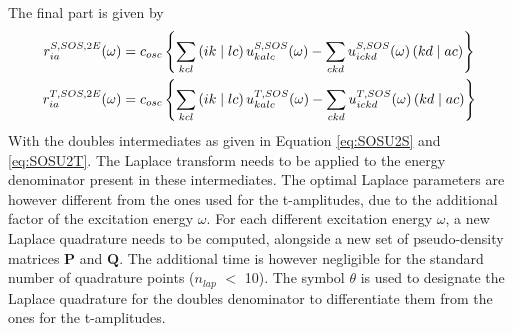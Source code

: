 The final part is given by
\begin{align}
r_{ia}^{S,SOS,2E}(\omega) &= c_{osc} \left\lbrace \sum_{kcl} \left( ik \mid lc \right) u^{S,SOS}_{kalc}(\omega) - \sum_{ckd} u^{S,SOS}_{ickd}(\omega) \left( kd \mid ac \right) \right\rbrace  \label{eq:SIGMA2ES}\\
r_{ia}^{T,SOS,2E}(\omega) &= c_{osc} \left\lbrace \sum_{kcl} \left( ik \mid lc \right) u^{T,SOS}_{kalc}(\omega) - \sum_{ckd} u^{T,SOS}_{ickd}(\omega) \left( kd \mid ac \right) \right\rbrace
\label{eq:SIGMA2ET}
\end{align}
\noindent With the doubles intermediates as given in Equation \ref{eq:SOSU2S} and \ref{eq:SOSU2T}. The Laplace transform needs to be applied to the energy denominator present in these intermediates. The optimal Laplace parameters are however different from the ones used for the t-amplitudes, due to the additional factor of the excitation energy $\omega$. For each different excitation energy $\omega$, a new Laplace quadrature needs to be computed, alongside a new set of pseudo-density matrices $\mathbf{P}$ and $\mathbf{Q}$. The additional time is however negligible for the standard number of quadrature points ($n_{lap}$ $<$ 10). The symbol $\theta$ is used to designate the Laplace quadrature for the doubles denominator to differentiate them from the ones for the t-amplitudes. 

